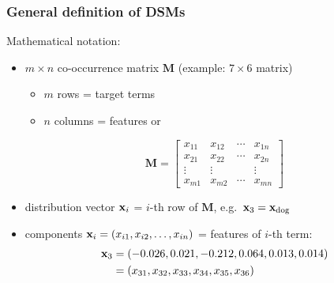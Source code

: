 \begin{frame}
  \frametitle{General definition of DSMs}

  Mathematical notation:
  \begin{itemize}
  \item $m \times n$ co-occurrence matrix $\mathbf{M}$ (example: $7\times 6$ matrix)
    \begin{itemize}
    \item $m$ rows = target terms
    \item $n$ columns = features or 
    \end{itemize}
    \begin{small}
      \gap[.5]
      \[
      \mathbf{M} =
      \begin{bmatrix}
        x_{11} & x_{12} & \cdots & x_{1n} \\
        x_{21} & x_{22} & \cdots & x_{2n} \\
        \vdots & \vdots & & \vdots \\
        x_{m1} & x_{m2} & \cdots & x_{mn}
      \end{bmatrix}
      \]
    \end{small}
  \item distribution vector $\vx_i$ = $i$-th row of $\mathbf{M}$, e.g.\ $\vx_3 = \vx_{\text{dog}}$
  \item components $\vx_i = (x_{i1}, x_{i2}, \ldots, x_{in})$ = features of $i$-th term:
    \begin{align*}
      \vx_3 &= (-0.026, 0.021, -0.212, 0.064, 0.013, 0.014) \\
      &= (x_{31}, x_{32}, x_{33}, x_{34}, x_{35}, x_{36})
    \end{align*}
  \end{itemize}

\end{frame}

